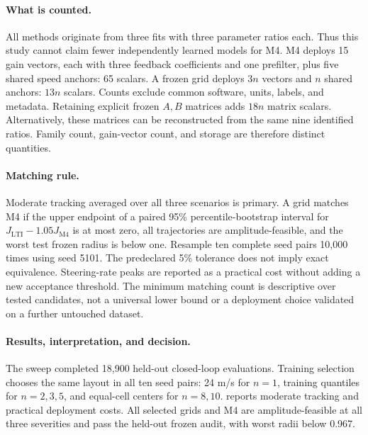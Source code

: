 \paragraph{What is counted.}
All methods originate from three fits with three parameter ratios each. Thus
this study cannot claim fewer independently learned models for M4. M4 deploys
15 gain vectors, each with three feedback coefficients and one prefilter,
plus five shared speed anchors: 65 scalars. A frozen grid deploys $3n$ vectors
and $n$ shared anchors: $13n$ scalars. Counts exclude common software, units,
labels, and metadata. Retaining explicit frozen $A,B$ matrices adds $18n$
matrix scalars. Alternatively, these matrices can be reconstructed from the
same nine identified ratios. Family count, gain-vector count, and storage
are therefore distinct quantities.

\paragraph{Matching rule.}
Moderate tracking averaged over all three scenarios is primary. A grid matches
M4 if the upper endpoint of a paired 95\% percentile-bootstrap interval for
$J_{\mathrm{LTI}}-1.05J_{\mathrm{M4}}$ is at most zero, all trajectories are
amplitude-feasible, and the worst test frozen radius is below one. Resample ten
complete seed pairs 10,000 times using seed 5101. The predeclared 5\% tolerance
does not imply exact equivalence. Steering-rate peaks are reported as a practical
cost without adding a new acceptance threshold. The minimum matching count is
descriptive over tested candidates, not a universal lower bound or a deployment
choice validated on a further untouched dataset.

\paragraph{Results, interpretation, and decision.}
The sweep completed 18,900 held-out closed-loop evaluations. Training selection
chooses the same layout in all ten seed pairs: 24 m/s for $n=1$, training
quantiles for $n=2,3,5$, and equal-cell centers for $n=8,10$.
 reports moderate tracking and practical deployment costs.
All selected grids and M4 are amplitude-feasible at all three severities and
pass the held-out frozen audit, with worst radii below 0.967.

